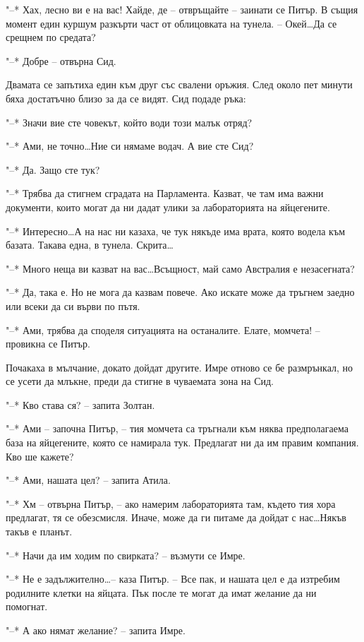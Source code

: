 \documentclass[ebook,openany,12pt]{memoir}
\begin{document}
"--* Хах, лесно ви е на вас! Хайде, де – отвръщайте – заинати се Питър. В същия момент един куршум разкърти част от облицовката на тунела. -- Окей\ldots Да се срещнем по средата?

"--* Добре – отвърна Сид.

Двамата се запътиха един към друг със свалени оръжия. След около пет минути бяха достатъчно близо за да се видят. Сид подаде ръка:

"--* Значи вие сте човекът, който води този малък отряд?

"--* Ами, не точно\ldots Ние си нямаме водач. А вие сте Сид?

"--* Да. Защо сте тук?

"--* Трябва да стигнем сградата на Парламента. Казват, че там има важни документи, които могат да ни дадат улики за лабораторията на яйцегените.

"--* Интересно\ldots А на нас ни казаха, че тук някъде има врата, която водела към базата. Такава една, в тунела. Скрита\ldots

"--* Много неща ви казват на вас\ldots Всъщност, май само Австралия е незасегната?

"--* Да, така е. Но не мога да казвам повече. Ако искате може да тръгнем заедно или всеки да си върви по пътя.

"--* Ами, трябва да споделя ситуацията на останалите. Елате, момчета! – провикна се Питър.

Почакаха в мълчание, докато дойдат другите. Имре отново се бе размрънкал, но се усети да млъкне, преди да стигне в чуваемата зона на Сид.

"--* Кво става ся? – запита Золтан.

"--* Ами -- започна Питър, – тия момчета са тръгнали към няква предполагаема база на яйцегените, която се намирала тук. Предлагат ни да им правим компания. Кво ше кажете?

"--* Ами, нашата цел? – запита Атила.

"--* Хм -- отвърна Питър, -- ако намерим лабораторията там, където тия хора предлагат, тя се обезсмисля. Иначе, може да ги питаме да дойдат с нас\ldots Някъв такъв е планът.

"--* Начи да им ходим по свирката? – възмути се Имре.

"--* Не е задължително\ldots -- каза Питър. -- Все пак, и нашата цел е да изтребим родилните клетки на яйцата. Пък после те могат да имат желание да ни помогнат.

"--* А ако нямат желание? -- запита Имре.
\end{document}
